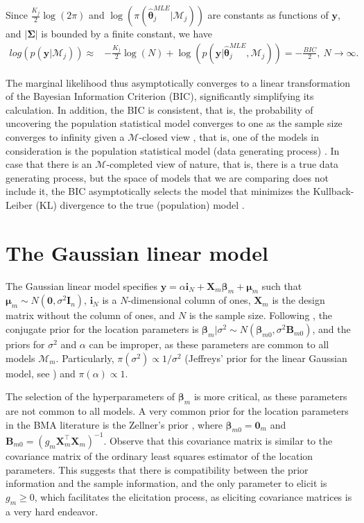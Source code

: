 Since $\frac{K_j}{2}\log(2\pi)$ and $\log(\pi(\bm{\hat{\theta}}_j^{MLE} | \mathcal{M}_j))$ are constants as functions of $\bm{y}$, and $|\bm{\Sigma}|$ is bounded by a finite constant, we have
\begin{align*}
	log\left(p(\bm{y} | \mathcal{M}_j)\right)\approx& -\frac{K_j}{2}\log(N)+\log(p(\bm{y}| \bm{\hat{\theta}}_j^{MLE},\mathcal{M}_j))= -\frac{BIC}{2}, \ N \rightarrow \infty.
\end{align*}

The marginal likelihood thus asymptotically converges to a linear transformation of the Bayesian Information Criterion (BIC), significantly simplifying its calculation. In addition, the BIC is consistent, that is, the probability of uncovering the population statistical model converges to one as the sample size converges to infinity given a $\mathcal{M}$-closed view \cite[Chap.~6]{Bernardo1994}, that is, one of the models in consideration is the population statistical model (data generating process) \cite{schwarz1978estimating, burnham2004multimodel}. In case that there is an $\mathcal{M}$-completed view of nature, that is, there is a true data generating process, but the space of models that we are comparing does not include it, the BIC asymptotically selects the model that minimizes the Kullback-Leiber (KL) divergence to the true (population) model \cite[Chap. ~4]{claeskens2008model}. 

\section{The Gaussian linear model}\label{sec10_2}

The Gaussian linear model specifies $\bm{y}=\alpha\bm{i}_N+\bm{X}_m\bm{\beta}_m+\bm{\mu}_m$ such that $\bm{\mu}_m\sim{N}(\bm{0},\sigma^2\bm{I}_n)$, $\bm{i}_N$ is a $N$-dimensional column of ones, $\bm{X}_m$ is the design matrix without the column of ones, and $N$ is the sample size. Following \cite{koop2003bayesian}, the conjugate prior for the location parameters is $\bm{\beta}_m|\sigma^2 \sim {N}(\bm{\beta}_{m0}, \sigma^2 \bm{B}_{m0})$, and the priors for $\sigma^2$ and $\alpha$ can be improper, as these parameters are common to all models $\mathcal{M}_m$. Particularly, $\pi(\sigma^2)\propto 1/\sigma^2$ (Jeffreys' prior for the linear Gaussian model, see \cite{prior1991bayesian}) and $\pi(\alpha)\propto 1$.

The selection of the hyperparameters of $\bm{\beta}_m$ is more critical, as these parameters are not common to all models. A very common prior for the location parameters in the BMA literature is the Zellner's prior \cite{zellner1986assessing}, where $\bm{\beta}_{m0}=\bm{0}_m$ and $\bm{B}_{m0}=(g_m\bm{X}_m^{\top}\bm{X}_m)^{-1}$. Observe that this covariance matrix is similar to the covariance matrix of the ordinary least squares estimator of the location parameters. This suggests that there is compatibility between the prior information and the sample information, and the only parameter to elicit is $g_m\geq 0$, which facilitates the elicitation process, as eliciting covariance matrices is a very hard endeavor.

